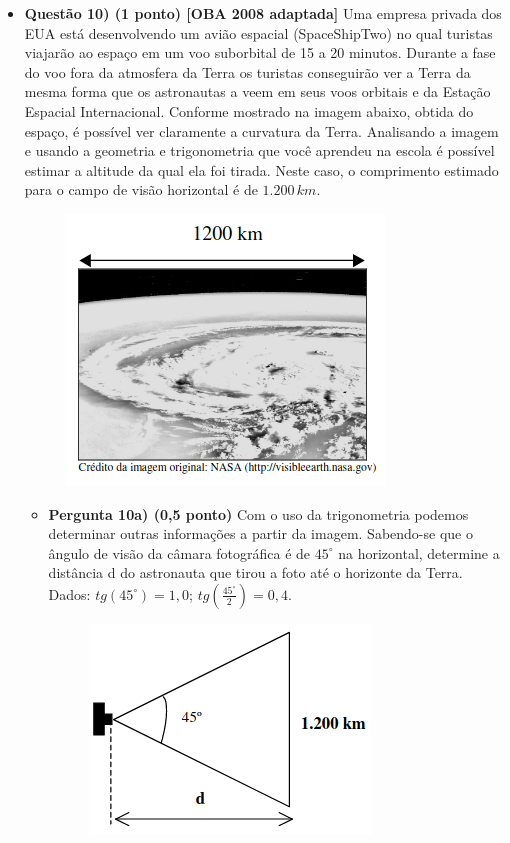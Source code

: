 \documentclass[a4paper, 12pt]{article}
\begin{document}
\begin{flushleft}
\begin{itemize}
            \item \textbf{Questão 10) (1 ponto) [OBA 2008 adaptada]} Uma empresa privada dos EUA está desenvolvendo um avião espacial (SpaceShipTwo) no qual turistas viajarão ao espaço em um voo suborbital de 15 a 20 minutos. Durante a fase do voo fora da atmosfera da Terra os turistas conseguirão ver a Terra da mesma forma que os astronautas a veem em seus voos orbitais e da Estação Espacial Internacional. Conforme mostrado na imagem abaixo, obtida do espaço, é possível ver claramente a curvatura da Terra. Analisando a imagem e usando a geometria e trigonometria que você aprendeu na escola é possível estimar a altitude da qual ela foi tirada. Neste caso, o comprimento estimado para o campo de visão horizontal é de $1.200 \, km$.
                \begin{figure}[H]
                    \centering
                    \includegraphics[scale=0.5]{img/10.png}
                \end{figure}
                \begin{itemize}
                    \item \textbf{Pergunta 10a) (0,5 ponto)} Com o uso da trigonometria podemos determinar outras informações a partir da imagem. Sabendo-se que o ângulo de visão da câmara fotográfica é de $45^{\circ}$ na horizontal, determine a distância d do astronauta que tirou a foto até o horizonte da Terra. Dados: $tg(45^{\circ}) = 1,0$; $tg \left(\frac{45^{\circ}}{2}\right) = 0,4$.
                        \begin{figure}[H]
                            \centering
                            \includegraphics[scale=0.5]{img/10a.png}

\end{figure}
\end{itemize}
\end{itemize}
\end{flushleft}
\end{document}

